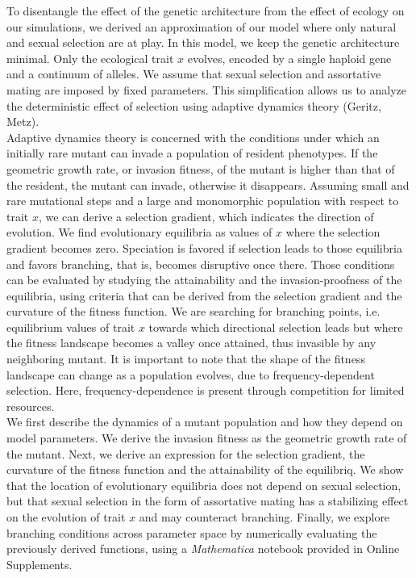 To disentangle the effect of the genetic architecture from the effect of ecology on our simulations, we derived an approximation of our model where only natural and sexual selection are at play. In this model, we keep the genetic architecture minimal. Only the ecological trait $x$ evolves, encoded by a single haploid gene and a continuum of alleles. We assume that sexual selection and assortative mating are imposed by fixed parameters. This simplification allows us to analyze the deterministic effect of selection using adaptive dynamics theory (Geritz, Metz).\\

Adaptive dynamics theory is concerned with the conditions under which an initially rare mutant can invade a population of resident phenotypes. If the geometric growth rate, or invasion fitness, of the mutant is higher than that of the resident, the mutant can invade, otherwise it disappears. Assuming small and rare mutational steps and a large and monomorphic population with respect to trait $x$, we can derive a selection gradient, which indicates the direction of evolution. We find evolutionary equilibria as values of $x$ where the selection gradient becomes zero. Speciation is favored if selection leads to those equilibria and favors branching, that is, becomes disruptive once there. Those conditions can be evaluated by studying the attainability and the invasion-proofness of the equilibria, using criteria that can be derived from the selection gradient and the curvature of the fitness function. We are searching for branching points, i.e. equilibrium values of trait $x$ towards which directional selection leads but where the fitness landscape becomes a valley once attained, thus invasible by any neighboring mutant. It is important to note that the shape of the fitness landscape can change as a population evolves, due to frequency-dependent selection. Here, frequency-dependence is present through competition for limited resources.\\

We first describe the dynamics of a mutant population and how they depend on model parameters. We derive the invasion fitness as the geometric growth rate of the mutant. Next, we derive an expression for the selection gradient, the curvature of the fitness function and the attainability of the equilibriq. We show that the location of evolutionary equilibria does not depend on sexual selection, but that sexual selection in the form of assortative mating has a stabilizing effect on the evolution of trait $x$ and may counteract branching. Finally, we explore branching conditions across parameter space by numerically evaluating the previously derived functions, using a \textit{Mathematica} notebook provided in Online Supplements.

